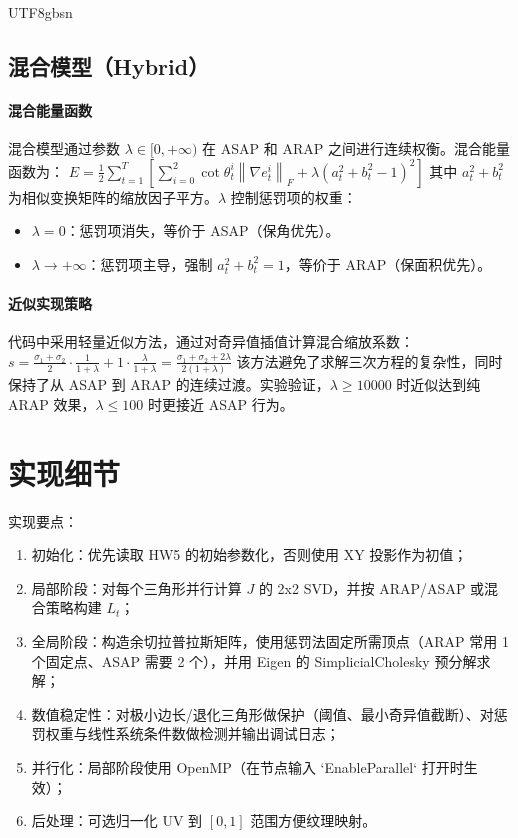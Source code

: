 \documentclass[10pt,a4paper,twocolumn]{article}
\newcommand{\fro}[1]{\left\|#1\right\|_F}
\begin{document}
\begin{CJK*}{UTF8}{gbsn}
\subsection{混合模型（Hybrid）}

\paragraph{混合能量函数}
混合模型通过参数 $\lambda \in [0, +\infty)$ 在 ASAP 和 ARAP 之间进行连续权衡。混合能量函数为：
$
E = \frac{1}{2}\sum_{t=1}^T\left[ \sum_{i=0}^2 \cot\theta_t^i \fro{\nabla e_t^i} + \lambda(a_t^2+b_t^2-1)^2 \right]
$
其中 $a_t^2 + b_t^2$ 为相似变换矩阵的缩放因子平方。$\lambda$ 控制惩罚项的权重：
\begin{itemize}
\item $\lambda = 0$：惩罚项消失，等价于 ASAP（保角优先）。
\item $\lambda \to +\infty$：惩罚项主导，强制 $a_t^2 + b_t^2 = 1$，等价于 ARAP（保面积优先）。
\end{itemize}

\paragraph{近似实现策略}
代码中采用轻量近似方法，通过对奇异值插值计算混合缩放系数：
$
s = \frac{\sigma_1+\sigma_2}{2} \cdot \frac{1}{1+\lambda} + 1 \cdot \frac{\lambda}{1+\lambda} = \frac{\sigma_1+\sigma_2 + 2\lambda}{2(1+\lambda)}
$
该方法避免了求解三次方程的复杂性，同时保持了从 ASAP 到 ARAP 的连续过渡。实验验证，$\lambda \ge 10000$ 时近似达到纯 ARAP 效果，$\lambda \le 100$ 时更接近 ASAP 行为。

\section{实现细节}
实现要点：
\begin{enumerate}
	\item 初始化：优先读取 HW5 的初始参数化，否则使用 XY 投影作为初值；
	\item 局部阶段：对每个三角形并行计算 $J$ 的 2x2 SVD，并按 ARAP/ASAP 或混合策略构建 $L_t$；
	\item 全局阶段：构造余切拉普拉斯矩阵，使用惩罚法固定所需顶点（ARAP 常用 1 个固定点、ASAP 需要 2 个），并用 Eigen 的 SimplicialCholesky 预分解求解；
	\item 数值稳定性：对极小边长/退化三角形做保护（阈值、最小奇异值截断）、对惩罚权重与线性系统条件数做检测并输出调试日志；
	\item 并行化：局部阶段使用 OpenMP（在节点输入 `EnableParallel` 打开时生效）；
	\item 后处理：可选归一化 UV 到 $[0,1]$ 范围方便纹理映射。
\end{enumerate}


\end{CJK*}
\end{document}
